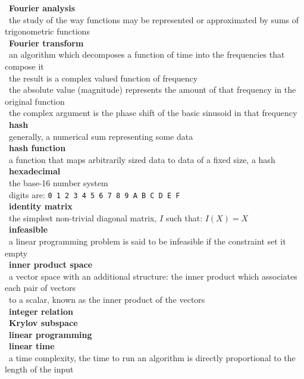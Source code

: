 \documentclass[10pt,letterpaper]{scrartcl}
\newcommand{\tbul}{\textbullet}
\newcommand{\tend}{\>\textendash}
\newcommand{\tasc}{\>\>\textasteriskcentered}
\begin{document}
\begin{tabbing}
\tbul\ \textbf{Fourier analysis} \\
    \tend\ the study of the way functions may be represented or approximated by sums of trigonometric functions \\
\tbul\ \textbf{Fourier transform} \\
    \tend\ an algorithm which decomposes a function of time into the frequencies that compose it \\
    \tend\ the result is a complex valued function of frequency \\
        \tasc\ the absolute value (magnitude) represents the amount of that frequency in the original function \\
        \tasc\ the complex argument is the phase shift of the basic sinusoid in that frequency \\
\tbul\ \textbf{hash} \\
    \tend\ generally, a numerical sum representing some data \\
\tbul\ \textbf{hash function} \\
    \tend\ a function that maps arbitrarily sized data to data of a fixed size, a hash \\
\tbul\ \textbf{hexadecimal} \\
    \tend\ the base-16 number system \\
    \tend\ digits are: \texttt{0 1 2 3 4 5 6 7 8 9 A B C D E F} \\
\tbul\ \textbf{identity matrix} \\
    \tend\ the simplest non-trivial diagonal matrix, $I$ such that: $I(X)=X$ \\
\tbul\ \textbf{infeasible} \\
    \tend\ a linear programming problem is said to be infeasible if the constraint set it empty \\
\tbul\ \textbf{inner product space} \\
    \tend\ a vector space with an additional structure: the inner product which associates each pair of vectors \\ \>\ to a scalar, known as the inner product of the vectors \\
\tbul\ \textbf{integer relation} \\
\tbul\ \textbf{Krylov subspace} \\
\tbul\ \textbf{linear programming} \\ 
\tbul\ \textbf{linear time} \\
    \tend\ a time complexity, the time to run an algorithm is directly proportional to the length of the input \\

\end{tabbing}
\end{document}

